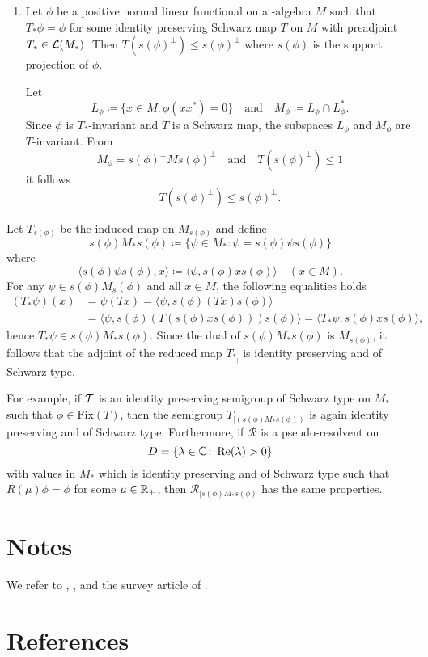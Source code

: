 \begin{enumerate}[1., wide, labelindent=.5em]
\item
Let $ \phi $ be a positive normal linear functional on a \WA-algebra $ M $ such that $ T_{*}\phi = \phi $ for some identity preserving Schwarz map $ T $ on $ M $ with preadjoint 
$ T_{*} \in \mathcal{L}(M_{*}) $.
Then $ T(s(\phi)^{\perp}) \leq s(\phi)^{\perp} $ where $ s(\phi) $ is the support projection of $ \phi $.

Let 
%
\[
	L_\phi \coloneqq \{ x \in M \colon \phi(xx^{*}) = 0 \}
	\quad \text{and} \quad
	M_\phi \coloneqq L_\phi \cap L_\phi^{*} .
\]
%
Since $ \phi $ is $ T_{*} $-invariant and $ T $ is a Schwarz map, the subspaces $ L_{\phi} $ and $ M_{\phi} $ are $ T $-invariant.
From 
\[ 
M_{\phi} = s(\phi)^{\perp}Ms(\phi)^{\perp} 
\quad \text{and} \quad 
T(s(\phi)^{\perp}) \leq 1 
\]
it follows 
\[ 
T(s(\phi)^{\perp}) \leq s(\phi)^{\perp}  .
\]
\end{enumerate}
Let $ T_{s(\phi)} $ be the induced map on $ M_{s(\phi)} $ and define
\[
	s(\phi)M_{*}s(\phi) \coloneqq \{\psi \in M_{*} \colon \psi = s(\phi)\psi s(\phi)\}
\]
where 
\[ 
\langle s(\phi)\psi s(\phi),x \rangle \coloneqq 
    \langle \psi,s(\phi)xs(\phi) \rangle \quad  (  x \in M  ).
\]
For any $\psi \in s(\phi)M_s(\phi)$ and all $x \in M$, the following equalities holds
\begin{align*}
(T_{*}\psi)(x) &= \psi(Tx) = \langle \psi,s(\phi)(Tx)s(\phi) \rangle \\
	&= \langle \psi,s(\phi)(T(s(\phi)xs(\phi)))s(\phi) \rangle = \langle T_{*}\psi,s(\phi)xs(\phi) \rangle,
\end{align*}
hence $ T_{*}\psi \in s(\phi)M_{*}s(\phi) $.
Since the dual of $ s(\phi)M_{*}s(\phi) $ is $ M_{s(\phi)} $, it follows that the adjoint of the reduced map $ T_{*_{|}} $ is identity preserving and of Schwarz type.

For example, if $ \mathcal{T} $ is an identity preserving semigroup of Schwarz type on $ M_{*} $ such that $ \phi \in \text{Fix}(T) $, then the semigroup $ T_{\vert (s(\phi)M_{*}s(\phi))} $ is again identity preserving and of Schwarz type.
Furthermore, if  $ \mathcal{R} $ is a pseudo-resolvent on 
%
\[
	D = \{\lambda \in \mathbb{C} \colon \mathop{}\!\mathrm{Re}(\lambda) > 0\} 
\]
%
with values in $ M_{*} $ which is identity preserving and of Schwarz type such that $ R(\mu)\phi = \phi $ for some $ \mu \in \mathbb{R}_{+} $, then $ \mathcal{R}_{\vert s(\phi)M_{*}s(\phi)} $ has the same properties.

\section*{Notes}
We refer to \citet{brattelirobinson:1979}, \citet{brattelirobinson:1981}, \citet{davies:1976} and the survey article of \citet{oseledets:1984}.

\section*{References}
{\RaggedRight
\renewcommand{\bibsection}{}

}